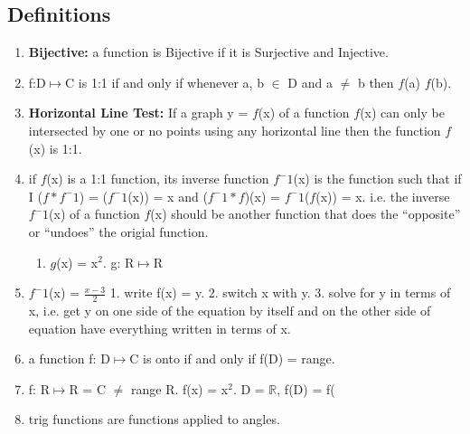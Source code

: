 \documentclass[12pt]{article}
\begin{document}
\subsection{Definitions}
\begin{enumerate}
    \item\textbf{Bijective: }a function is Bijective if it is Surjective and Injective.

    \item f:D\(\mapsto\)C is 1:1 if and only if whenever a, b \(\in\) D and a \(\neq\) b then \(f\)(a) \neq \(f\)(b).

    \item \textbf{Horizontal Line Test: }If a graph y = \(f\)(x) of a function \(f\)(x) can only be intersected by one or no points using any horizontal line then the function \(f\)(x) is 1:1.

    \item if \(f\)(x) is a 1:1 function, its inverse function \(f^-1\)(x) is the function such that if I (\(f * f^-1\)) = (\(f^-1\)(x)) = x and (\(f^-1 * f\))(x) = \(f^-1\)(\(f\)(x)) = x. i.e. the inverse \(f^-1\)(x) of a function \(f\)(x) should be another function that does the ``opposite'' or ``undoes'' the origial function.
    \begin{enumerate}
        \item \(g\)(x) = x\(^2\). g: R\(\mapsto\)R
    \end{enumerate}

    \item \(f^-1\)(x) = \(\frac{x-3}{2}\) 1. write f(x) = y. 2. switch x with y. 3. solve for y in terms of x, i.e. get y on one side of the equation by itself and on the other side of equation have everything written in terms of x.

    \item a function f: D\(\mapsto\)C is onto if and only if f(D) = range.

    \item f: R\(\mapsto\)R = C \(\neq\) range R. f(x) = x\(^2\). D = $\mathbb{R}$, f(D) = f($$

    \item trig functions are functions applied to angles.


\end{enumerate}
\end{document}
